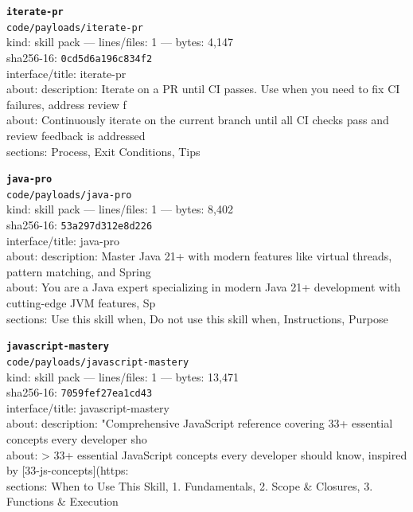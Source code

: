 \noindent\textbf{\texttt{iterate-pr}}\\
\texttt{code/payloads/iterate-pr}\\
kind: skill pack --- lines/files: 1 --- bytes: 4,147\\
sha256-16: \texttt{0cd5d6a196c834f2}\\
interface/title: iterate-pr\\
about: description: Iterate on a PR until CI passes. Use when you need to fix CI failures, address review f\\
about: Continuously iterate on the current branch until all CI checks pass and review feedback is addressed\\
sections: Process, Exit Conditions, Tips\\
\vspace*{6.0pt}
\newpage

\noindent\textbf{\texttt{java-pro}}\\
\texttt{code/payloads/java-pro}\\
kind: skill pack --- lines/files: 1 --- bytes: 8,402\\
sha256-16: \texttt{53a297d312e8d226}\\
interface/title: java-pro\\
about: description: Master Java 21+ with modern features like virtual threads, pattern matching, and Spring\\
about: You are a Java expert specializing in modern Java 21+ development with cutting-edge JVM features, Sp\\
sections: Use this skill when, Do not use this skill when, Instructions, Purpose\\
\vspace*{6.0pt}

\noindent\textbf{\texttt{javascript-mastery}}\\
\texttt{code/payloads/javascript-mastery}\\
kind: skill pack --- lines/files: 1 --- bytes: 13,471\\
sha256-16: \texttt{7059fef27ea1cd43}\\
interface/title: javascript-mastery\\
about: description: "Comprehensive JavaScript reference covering 33+ essential concepts every developer sho\\
about: > 33+ essential JavaScript concepts every developer should know, inspired by [33-js-concepts](https:\\
sections: When to Use This Skill, 1. Fundamentals, 2. Scope \& Closures, 3. Functions \& Execution\\
\vspace*{6.0pt}

